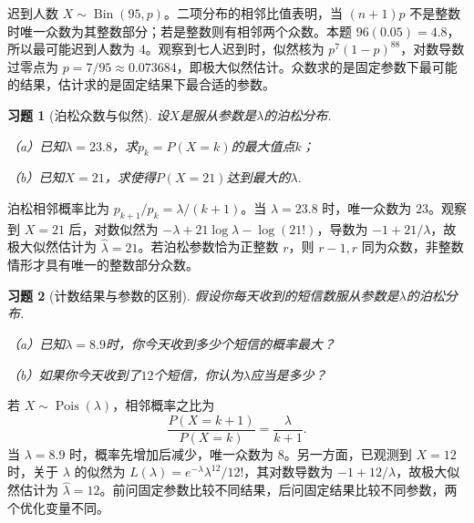 \documentclass[UTF8,12pt,a4paper,fontset=fandol]{ctexart}
\newtheorem{exercise}{习题}[section]
\begin{document}
\begin{solve}\label{a:Y3.22}迟到人数 $X\sim\operatorname{Bin}(95,p)$。二项分布的相邻比值表明，当 $(n+1)p$ 不是整数时唯一众数为其整数部分；若是整数则有相邻两个众数。本题 $96(0.05)=4.8$，所以最可能迟到人数为 $4$。观察到七人迟到时，似然核为 $p^7(1-p)^{88}$，对数导数过零点为 $p=7/95\approx0.073684$，即极大似然估计。众数求的是固定参数下最可能的结果，估计求的是固定结果下最合适的参数。\end{solve}

\begin{exercise}[泊松众数与似然]\label{q:Y3.23}
设$X$是服从参数是$\lambda$的泊松分布.

（a）已知$\lambda=23.8$，求$p_k=P(X=k)$的最大值点$k$；

（b）已知$X=21$，求使得$P(X=21)$达到最大的$\lambda$.\par{}
\end{exercise}

\begin{solve}\label{a:Y3.23}泊松相邻概率比为 $p_{k+1}/p_k=\lambda/(k+1)$。当 $\lambda=23.8$ 时，唯一众数为 $23$。观察到 $X=21$ 后，对数似然为 $-\lambda+21\log\lambda-\log(21!)$，导数为 $-1+21/\lambda$，故极大似然估计为 $\widehat\lambda=21$。若泊松参数恰为正整数 $r$，则 $r-1,r$ 同为众数，非整数情形才具有唯一的整数部分众数。\end{solve}

\begin{exercise}[计数结果与参数的区别]\label{q:Y3.24}
假设你每天收到的短信数服从参数是$\lambda$的泊松分布.

（a）已知$\lambda=8.9$时，你今天收到多少个短信的概率最大？

（b）如果你今天收到了$12$个短信，你认为$\lambda$应当是多少？\par{}
\end{exercise}

\begin{solve}\label{a:Y3.24}若 $X\sim\operatorname{Pois}(\lambda)$，相邻概率之比为\[\frac{P(X=k+1)}{P(X=k)}=\frac{\lambda}{k+1}.\]当 $\lambda=8.9$ 时，概率先增加后减少，唯一众数为 $8$。另一方面，已观测到 $X=12$ 时，关于 $\lambda$ 的似然为 $L(\lambda)=e^{-\lambda}\lambda^{12}/12!$，其对数导数为 $-1+12/\lambda$，故极大似然估计为 $\widehat\lambda=12$。前问固定参数比较不同结果，后问固定结果比较不同参数，两个优化变量不同。\end{solve}
\end{document}
